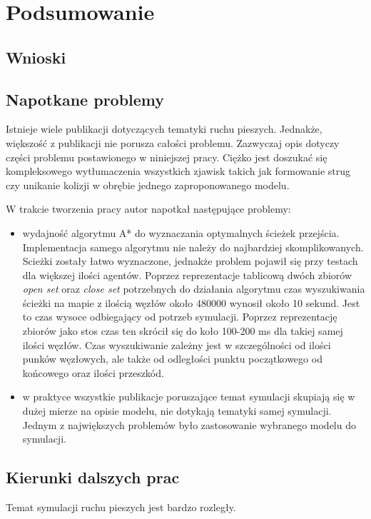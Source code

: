 \chapter{Podsumowanie}
\label{cha:podsumowanie}

\section{Wnioski}


\section{Napotkane problemy}

Istnieje wiele publikacji dotyczących tematyki ruchu pieszych. Jednakże, większość z publikacji nie porusza całości problemu. Zazwyczaj opis dotyczy części problemu postawionego w niniejszej pracy. Ciężko jest doszukać się kompleksowego wytłumaczenia wszystkich zjawisk takich jak formowanie strug czy unikanie kolizji w obrębie jednego zaproponowanego modelu.

W trakcie tworzenia pracy autor napotkał następujące problemy:

\begin{itemize}
\item wydajność algorytmu A* do wyznaczania optymalnych ścieżek przejścia. Implementacja samego algorytmu nie należy do najbardziej skomplikowanych. Scieżki zostały łatwo wyznaczone, jednakże problem pojawił się przy testach dla większej ilości agentów. Poprzez reprezentacje tablicową dwóch zbiorów \textit{open set} oraz \textit{close set} potrzebnych do działania algorytmu czas wyszukiwania ścieżki na mapie z ilością węzłów około $480000$ wynosił około 10 sekund. Jest to czas wysoce odbiegający od potrzeb symulacji. Poprzez reprezentację zbiorów jako stos czas ten skrócił się do koło 100-200 ms dla takiej samej ilości węzłów. Czas wyszukiwanie zależny jest w szczególności od ilości punków węzłowych, ale także od odległości punktu początkowego od końcowego oraz ilości przeszkód.

\item w praktyce wszystkie publikacje poruszające temat symulacji skupiają się w dużej mierze na opisie modelu, nie dotykają tematyki samej symulacji. Jednym z największych problemów było zastosowanie wybranego modelu do symulacji.
\end{itemize}

\section{Kierunki dalszych prac}

Temat symulacji ruchu pieszych jest bardzo rozległy. 